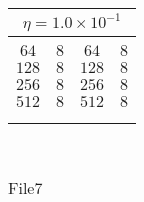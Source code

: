 \documentclass[10pt]{article}
\begin{document}
\begin{center}
\begin{table}[]
\begin{center}
\begin{tabular}{@{}cc|cc@{}}
\multicolumn{4}{c}{$\eta = 1.0\times 10^{-1}$} \\[5pt]
\hline\\[-11pt]
$64$ & $8$ & $64$ & $8$ \\ [1pt]
$128$ & $8$ & $128$ & $8$ \\ [1pt]
$256$ & $8$ & $256$ & $8$ \\ [1pt]
$512$ & $8$ & $512$ & $8$ \\ [1pt]
\hline\\[-11pt]

\hline\\[-8pt]
\end{tabular}\\[5pt]
\end{center}
\normalsize
\end{table}

\begin{table}[]
  \small
  \caption{File7}\label{tab:tab2}
\begin{center}
\begin{tabular}{@{}cc|cc@{}}


\end{tabular}
\end{center}
\end{table}
\end{center}
\end{document}
